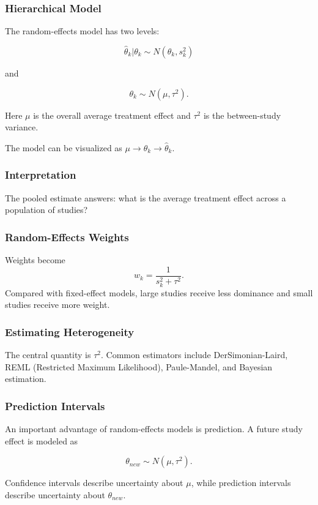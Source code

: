\documentclass[11pt]{article}
\begin{document}
\subsubsection*{Hierarchical Model}

The random-effects model has two levels:

\[\hat{\theta}_k|\theta_k\sim N(\theta_k,s_k^2)\]

and

\[\theta_k\sim N(\mu,\tau^2).\]

Here $\mu$ is the overall average treatment effect and $\tau^2$ is the between-study variance.

The model can be visualized as $\mu\rightarrow\theta_k\rightarrow\hat{\theta}_k$.

\subsubsection*{Interpretation}

The pooled estimate answers: what is the average treatment effect across a population of studies?

\subsubsection*{Random-Effects Weights}

Weights become
\[w_k=\frac{1}{s_k^2+\tau^2}.\]
Compared with fixed-effect models, large studies receive less dominance and small studies receive more weight.

\subsubsection*{Estimating Heterogeneity}

The central quantity is $\tau^2$. Common estimators include DerSimonian-Laird, REML (Restricted Maximum Likelihood), Paule-Mandel, and Bayesian estimation.

\subsubsection*{Prediction Intervals}

An important advantage of random-effects models is prediction. A future study effect is modeled as

\[\theta_{new}\sim N(\mu,\tau^2).\]

Confidence intervals describe uncertainty about $\mu$, while prediction intervals describe uncertainty about $\theta_{new}$.
\end{document}
